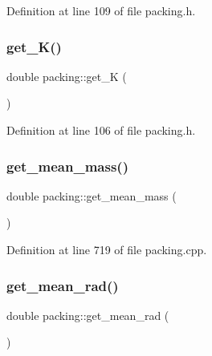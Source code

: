Definition at line 109 of file packing.\+h.

\mbox{\label{classpacking_ab484a3d36c45db72614267af5a203f76}} 
\subsubsection{\texorpdfstring{get\+\_\+\+K()}{get\_K()}}
{\footnotesize\ttfamily double packing\+::get\+\_\+K (\begin{DoxyParamCaption}{ }\end{DoxyParamCaption})\hspace{0.3cm}{\ttfamily [inline]}}



Definition at line 106 of file packing.\+h.

\mbox{\label{classpacking_aed06b7bd33506e2e26fd4b95749873a8}} 
\subsubsection{\texorpdfstring{get\+\_\+mean\+\_\+mass()}{get\_mean\_mass()}}
{\footnotesize\ttfamily double packing\+::get\+\_\+mean\+\_\+mass (\begin{DoxyParamCaption}{ }\end{DoxyParamCaption})}



Definition at line 719 of file packing.\+cpp.

\mbox{\label{classpacking_ace5de1e50143754b63f3922ed9dcd646}} 
\subsubsection{\texorpdfstring{get\+\_\+mean\+\_\+rad()}{get\_mean\_rad()}}
{\footnotesize\ttfamily double packing\+::get\+\_\+mean\+\_\+rad (\begin{DoxyParamCaption}{ }\end{DoxyParamCaption})}



